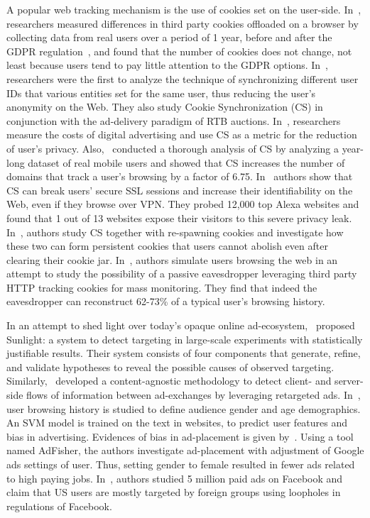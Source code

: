 \documentclass{article}
\begin{document}
A popular web tracking mechanism is the use of cookies set on the user-side.
In~\cite{hu2019characterising}, researchers measured differences in third party cookies offloaded on a browser by collecting data from real users over a period of 1 year, before and after the GDPR regulation~\cite{europeanDataRules2018}, and found that the number of cookies does not change, not least because users tend to pay little attention to the GDPR options.
In~\cite{castelluccia2014selling}, researchers were the first to analyze the technique of synchronizing different user IDs that various entities set for the same user, thus reducing the user's anonymity on the Web.
They also study Cookie Synchronization (CS) in conjunction with the ad-delivery paradigm of RTB auctions.
In~\cite{costOfAds}, researchers measure the costs of digital advertising and use CS as a metric for the reduction of user's privacy.
Also,~\cite{panpap_www2019} conducted a thorough analysis of CS by analyzing a year-long dataset of real mobile users and showed that CS increases the number of domains that track a user's browsing by a factor of 6.75.
In~\cite{exclusiveCSync} authors show that CS can break users' secure SSL sessions and increase their identifiability on the Web, even if they browse over VPN.
They probed 12,000 top Alexa websites and found that 1 out of 13 websites expose their visitors to this severe privacy leak.
In~\cite{acar2014web}, authors study CS together with re-spawning cookies and investigate how these two can form persistent cookies that users cannot abolish even after clearing their cookie jar.
In~\cite{englehardt2015cookies}, authors simulate users browsing the web in an attempt to study the possibility of a passive eavesdropper leveraging third party HTTP tracking cookies for mass monitoring.
They find that indeed the eavesdropper can reconstruct 62-73\% of a typical user's browsing history.

In an attempt to shed light over today's opaque online ad-ecosystem,~\cite{lecuyer2015sunlight} proposed Sunlight: a system to detect targeting in large-scale experiments with statistically justifiable results.
Their system consists of four components that generate, refine, and validate hypotheses to reveal the possible causes of observed targeting.
Similarly,~\cite{bashir2016} developed a content-agnostic methodology to detect client- and server-side flows of information between ad-exchanges by leveraging retargeted ads.
In~\cite{zhang2017targeted}, user browsing history is studied to define audience gender and age demographics.
An SVM model is trained on the text in websites, to predict user features and bias in advertising.
Evidences of bias in ad-placement is given by~\cite{datta2015automated}.
Using a tool named AdFisher, the authors investigate ad-placement with adjustment of Google ads settings of user.
Thus, setting gender to female resulted in fewer ads related to high paying jobs.
In~\cite{kim2018stealth}, authors studied 5 million paid ads on Facebook and claim that US users are mostly targeted by foreign groups using loopholes in regulations of Facebook.
\end{document}
